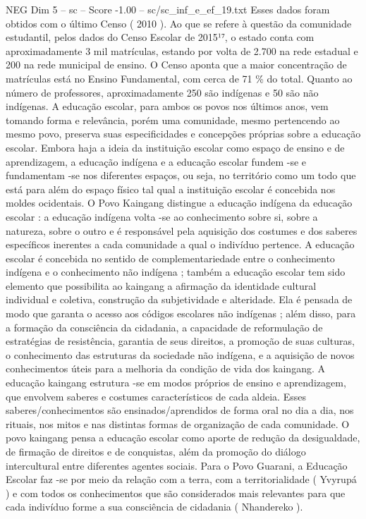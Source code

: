 \begin{textsample}{NEG Dim 5 – sc – Score -1.00 – sc/sc\_inf\_e\_ef\_19.txt}
Esses dados foram obtidos com o último Censo ( 2010 ).
Ao que se refere à questão da comunidade estudantil, pelos dados do Censo Escolar de 2015¹⁷, o estado conta com aproximadamente 3 mil matrículas, estando por volta de 2.700 na rede estadual e 200 na rede municipal de ensino.
O Censo aponta que a maior concentração de matrículas está no Ensino Fundamental, com cerca de 71 \% do total.
Quanto ao número de professores, aproximadamente 250 são indígenas e 50 são não indígenas.
A educação escolar, para ambos os povos nos últimos anos, vem tomando forma e relevância, porém uma comunidade, mesmo pertencendo ao mesmo povo, preserva suas especificidades e concepções próprias sobre a educação escolar.
Embora haja a ideia da instituição escolar como espaço de ensino e de aprendizagem, a educação indígena e a educação escolar fundem -se e fundamentam -se nos diferentes espaços, ou seja, no território como um todo que está para além do espaço físico tal qual a instituição escolar é concebida nos moldes ocidentais.
O Povo Kaingang distingue a educação indígena da educação escolar : a educação indígena volta -se ao conhecimento sobre si, sobre a natureza, sobre o outro e é responsável pela aquisição dos costumes e dos saberes específicos inerentes a cada comunidade a qual o indivíduo pertence.
A educação escolar é concebida no sentido de complementariedade entre o conhecimento indígena e o conhecimento não indígena ; também a educação escolar tem sido elemento que possibilita ao kaingang a afirmação da identidade cultural individual e coletiva, construção da subjetividade e alteridade.
Ela é pensada de modo que garanta o acesso aos códigos escolares não indígenas ; além disso, para a formação da consciência da cidadania, a capacidade de reformulação de estratégias de resistência, garantia de seus direitos, a promoção de suas culturas, o conhecimento das estruturas da sociedade não indígena, e a aquisição de novos conhecimentos úteis para a melhoria da condição de vida dos kaingang.
A educação kaingang estrutura -se em modos próprios de ensino e aprendizagem, que envolvem saberes e costumes característicos de cada aldeia.
Esses saberes/conhecimentos são ensinados/aprendidos de forma oral no dia a dia, nos rituais, nos mitos e nas distintas formas de organização de cada comunidade.
O povo kaingang pensa a educação escolar como aporte de redução da desigualdade, de firmação de direitos e de conquistas, além da promoção do diálogo intercultural entre diferentes agentes sociais.
Para o Povo Guarani, a Educação Escolar faz -se por meio da relação com a terra, com a territorialidade ( Yvyrupá ) e com todos os conhecimentos que são considerados mais relevantes para que cada indivíduo forme a sua consciência de cidadania ( Nhandereko ).

\end{textsample}
